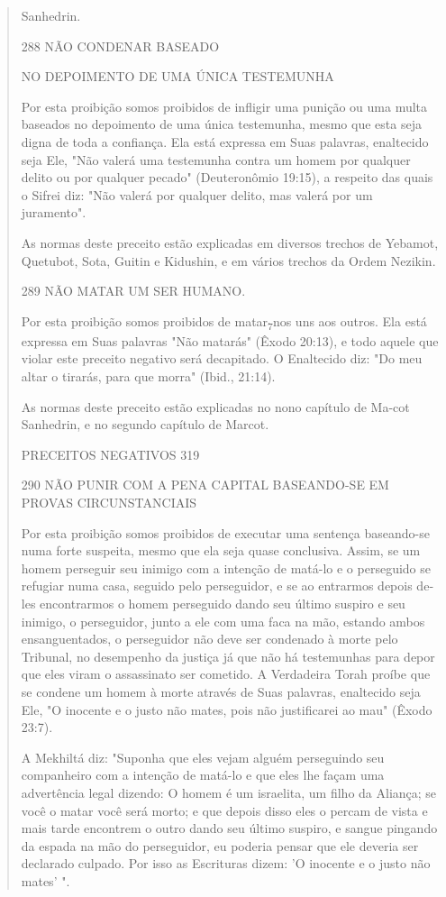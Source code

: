\begin{quote}
Sanhedrin.

288 NÃO CONDENAR BASEADO

NO DEPOIMENTO DE UMA ÚNICA TESTEMUNHA

Por esta proibição somos proibidos de infligir uma punição ou uma multa
baseados no depoimento de uma única testemunha, mesmo que esta seja
digna de toda a confiança. Ela está expressa em Suas palavras,
enaltecido seja Ele, "Não valerá uma testemunha contra um homem por
qualquer delito ou por qualquer pecado" (Deuteronômio 19:15), a respeito
das quais o Sifrei diz: "Não valerá por qualquer delito, mas valerá por
um juramento".

As normas deste preceito estão explicadas em diversos trechos de
Yebamot, Quetubot, Sota, Guitin e Kidushin, e em vários trechos da Ordem
Nezikin.

289 NÃO MATAR UM SER HUMANO.

Por esta proibição somos proibidos de matar\textsubscript{7}nos uns aos
outros. Ela está expressa em Suas palavras "Não matarás" (Êxodo 20:13),
e todo aquele que violar este preceito negativo será decapitado. O
Enaltecido diz: "Do meu altar o tirarás, para que morra" (Ibid., 21:14).

As normas deste preceito estão explicadas no nono capítulo de Ma-cot
Sanhedrin, e no segundo capítulo de Marcot.

PRECEITOS NEGATIVOS 319

290 NÃO PUNIR COM A PENA CAPITAL BASEANDO-SE EM PROVAS CIRCUNSTANCIAIS

Por esta proibição somos proibidos de executar uma sentença baseando-se
numa forte suspeita, mesmo que ela seja quase conclusiva. Assim, se um
homem perseguir seu inimigo com a intenção de matá-lo e o perseguido se
refugiar numa casa, seguido pelo perseguidor, e se ao entrarmos depois
de­les encontrarmos o homem perseguido dando seu último suspiro e seu
inimi­go, o perseguidor, junto a ele com uma faca na mão, estando ambos
ensanguen­tados, o perseguidor não deve ser condenado à morte pelo
Tribunal, no de­sempenho da justiça já que não há testemunhas para depor
que eles viram o assassinato ser cometido. A Verdadeira Torah proíbe que
se condene um ho­mem à morte através de Suas palavras, enaltecido seja
Ele, "O inocente e o jus­to não mates, pois não justificarei ao mau"
(Êxodo 23:7).

A Mekhiltá diz: "Suponha que eles vejam alguém perseguindo seu
companheiro com a intenção de matá-lo e que eles lhe façam uma
advertência legal dizendo: O homem é um israelita, um filho da Aliança;
se você o matar você será morto; e que depois disso eles o percam de
vista e mais tarde encon­trem o outro dando seu último suspiro, e sangue
pingando da espada na mão do perseguidor, eu poderia pensar que ele
deveria ser declarado culpado. Por isso as Escrituras dizem: 'O inocente
e o justo não mates' ".


\end{quote}
